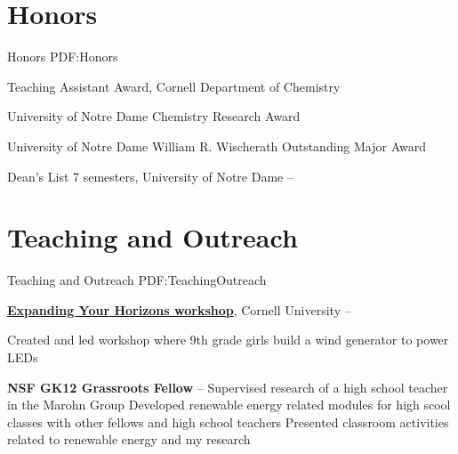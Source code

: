\documentclass[letterpaper,MMMyyyy,nonstop]{simpleresumecv}
\begin{document}
\begin{body}
\section
{Honors}
{Honors}
{PDF:Honors}

Teaching Assistant Award, Cornell Department of Chemistry
\hfill
{}

University of Notre Dame Chemistry Research Award
\hfill
{}

University of Notre Dame William R. Wischerath Outstanding Major Award
\hfill
{}

Dean's List 7 semesters, University of Notre Dame
\hfill
{} --






\section
{Teaching and Outreach}
{Teaching and Outreach}
{PDF:TeachingOutreach}

\href{https://www.eyh.cornell.edu}
{\textbf{Expanding Your Horizons workshop}},
Cornell University
\hfill
{} --

\BulletItem Created and led workshop where 9th grade girls build a wind generator to power LEDs 

\textbf{NSF GK12 Grassroots Fellow}
\hfill
{} -- 
\BulletItem Supervised research of a high school teacher in the Marohn Group
\BulletItem Developed renewable energy related modules for high scool classes with other fellows and high school teachers
\BulletItem Presented classroom activities related to renewable energy and my research 


\end{body}
\end{document}
